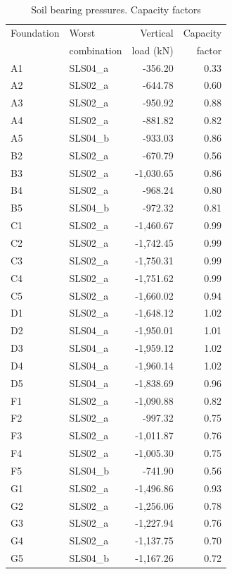 \begin{table}
\begin{center}
  \begin{scriptsize}
  \begin{tabular}{|l|l|r|r|}
\hline
Foundation & Worst & Vertical & Capacity\\
 & combination & load (kN) & factor\\
\hline
 A1 &  SLS04\_a & -356.20 & 0.33\\
 A2 &  SLS02\_a & -644.78 & 0.60\\
 A3 &  SLS02\_a & -950.92 & 0.88\\
 A4 &  SLS02\_a & -881.82 & 0.82\\
 A5 &  SLS04\_b & -933.03 & 0.86\\
 B2 &  SLS02\_a & -670.79 & 0.56\\
 B3 &  SLS02\_a & -1,030.65 & 0.86\\
 B4 &  SLS02\_a & -968.24 & 0.80\\
 B5 &  SLS04\_b & -972.32 & 0.81\\
 C1 &  SLS02\_a & -1,460.67 & 0.99\\
 C2 &  SLS02\_a & -1,742.45 & 0.99\\
 C3 &  SLS02\_a & -1,750.31 & 0.99\\
 C4 &  SLS02\_a & -1,751.62 & 0.99\\
 C5 &  SLS02\_a & -1,660.02 & 0.94\\
 D1 &  SLS02\_a & -1,648.12 & 1.02\\
 D2 &  SLS04\_a & -1,950.01 & 1.01\\
 D3 &  SLS04\_a & -1,959.12 & 1.02\\
 D4 &  SLS04\_a & -1,960.14 & 1.02\\
 D5 &  SLS04\_a & -1,838.69 & 0.96\\
 F1 &  SLS02\_a & -1,090.88 & 0.82\\
 F2 &  SLS02\_a & -997.32 & 0.75\\
 F3 &  SLS02\_a & -1,011.87 & 0.76\\
 F4 &  SLS02\_a & -1,005.30 & 0.75\\
 F5 &  SLS04\_b & -741.90 & 0.56\\
 G1 &  SLS02\_a & -1,496.86 & 0.93\\
 G2 &  SLS02\_a & -1,256.06 & 0.78\\
 G3 &  SLS02\_a & -1,227.94 & 0.76\\
 G4 &  SLS02\_a & -1,137.75 & 0.70\\
 G5 &  SLS04\_b & -1,167.26 & 0.72\\
\hline
  \end{tabular}
  \end{scriptsize}
  \end{center}
\caption{Soil bearing pressures. Capacity factors}\label{tb_soil_bearing}
\end{table}

